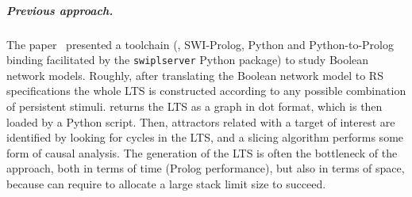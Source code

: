 \subparagraph*{Previous approach.}
The paper~\cite{datamod2023} presented a toolchain (\BioResolve, SWI-Prolog, Python and Python-to-Prolog binding facilitated by the \verb=swiplserver= Python package) to study Boolean network models. Roughly, after translating the Boolean network model to RS specifications the whole LTS  is constructed according to any possible combination of persistent stimuli. \BioResolve returns the LTS as a graph in dot format, which is then loaded by a Python script. Then, attractors related with a target of interest are identified by looking for cycles in the LTS, and a slicing algorithm performs some form of causal analysis.
The generation of the LTS is often the bottleneck of the approach, both in terms of time (Prolog performance), but also in terms of space, because \BioResolve can require to allocate a large stack limit size to succeed. 

% 
%

